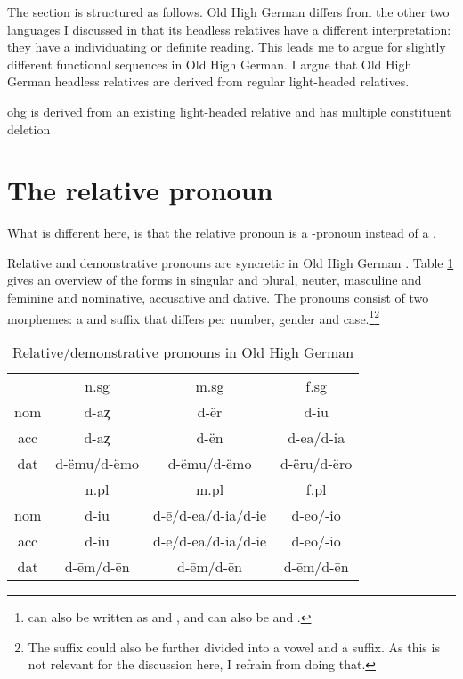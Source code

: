 The section is structured as follows.
Old High German differs from the other two languages I discussed in that its headless relatives have a different interpretation: they have a individuating or definite reading. This leads me to argue for slightly different functional sequences in Old High German.
I argue that Old High German headless relatives are derived from regular light-headed relatives.


ohg is derived from an existing light-headed relative
and has multiple constituent deletion


\section{The relative pronoun}

What is different here, is that the relative pronoun is a -pronoun instead of a .


Relative and demonstrative pronouns are syncretic in Old High German . Table \ref{tbl:rel-dem-ohg} gives an overview of the forms in singular and plural, neuter, masculine and feminine and nominative, accusative and dative. The pronouns consist of two morphemes: a  and suffix that differs per number, gender and case.\footnote{
 can also be written as  and ,  and  can also be  and  .
}\footnote{
The suffix could also be further divided into a vowel and a suffix. As this is not relevant for the discussion here, I refrain from doing that.
}

\begin{table}[htbp]
 \center
 \caption {Relative/demonstrative pronouns in Old High German }
  \begin{tabular}{cccc}
  \toprule
            & \ac{n}.\ac{sg}  & \ac{m}.\ac{sg}      & \ac{f}.\ac{sg}    \\
        \cmidrule{2-4}
  \ac{nom}  & d-aȥ            & d-ër                & d-iu               \\
  \ac{acc}  & d-aȥ            & d-ën                & d-ea/d-ia         \\
  \ac{dat}  & d-ëmu/d-ëmo     & d-ëmu/d-ëmo         & d-ëru/d-ëro       \\
  \bottomrule
            & \ac{n}.\ac{pl}  & \ac{m}.\ac{pl}      &  \ac{f}.\ac{pl}  \\
        \cmidrule{2-4}
  \ac{nom}  & d-iu            &  d-ē/d-ea/d-ia/d-ie & d-eo/-io         \\
  \ac{acc}  & d-iu            &  d-ē/d-ea/d-ia/d-ie & d-eo/-io         \\
  \ac{dat}  & d-ēm/d-ēn       &  d-ēm/d-ēn          & d-ēm/d-ēn        \\
    \bottomrule
  \end{tabular}
  \label{tbl:rel-dem-ohg}
\end{table}


